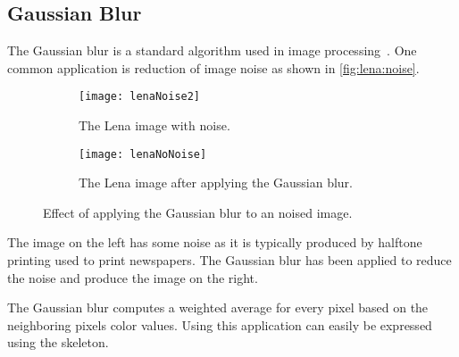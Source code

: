 \subsection{Gaussian Blur}
\label{sec:gauss}
The Gaussian blur is a standard algorithm used in image processing~\cite{Umbaugh1997}.
One common application is reduction of image noise as shown in \autoref{fig:lena:noise}.
%
\begin{figure}[tb]
  \centering
  \begin{subfigure}[t]{.45\textwidth}
    \texttt{[image: lenaNoise2]}
    \caption{The Lena image with noise.}
    \label{fig:lena:noise:yes}
  \end{subfigure}
  \hfill
  \begin{subfigure}[t]{.45\textwidth}
    \texttt{[image: lenaNoNoise]}
    \caption{The Lena image after applying the Gaussian blur.}
    \label{fig:lena:noise:no}
  \end{subfigure}
  \caption{Effect of applying the Gaussian blur to an noised image.}
  \label{fig:lena:noise}
\end{figure}
%
The image on the left has some noise as it is typically produced by halftone printing used to print newspapers.
The Gaussian blur has been applied to reduce the noise and produce the image on the right.

The Gaussian blur computes a weighted average for every pixel based on the neighboring pixels color values.
Using \SkelCL this application can easily be expressed using the \stencil skeleton.

